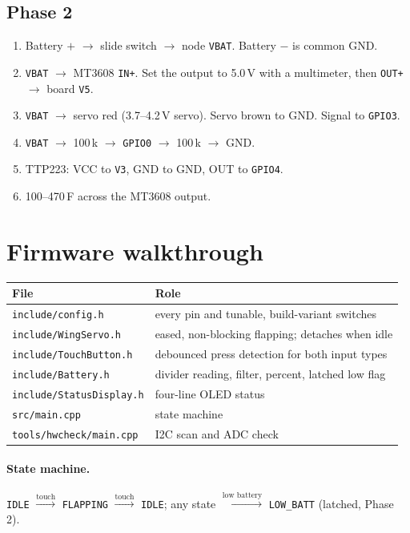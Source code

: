 \documentclass[11pt,a4paper]{article}
\newcommand{\gpio}[1]{\texttt{GPIO#1}}
\begin{document}
\subsection{Phase 2}
\begin{enumerate}
  \item Battery $+$ $\to$ slide switch $\to$ node \texttt{VBAT}. Battery $-$ is common GND.
  \item \texttt{VBAT} $\to$ MT3608 \texttt{IN+}. Set the output to 5.0\,V with a multimeter, then \texttt{OUT+} $\to$ board \texttt{V5}.
  \item \texttt{VBAT} $\to$ servo red (3.7--4.2\,V servo). Servo brown to GND. Signal to \gpio{3}.
  \item \texttt{VBAT} $\to$ 100\,k $\to$ \gpio{0} $\to$ 100\,k $\to$ GND.
  \item TTP223: VCC to \texttt{V3}, GND to GND, OUT to \gpio{4}.
  \item 100--470\,\textmu F across the MT3608 output.
\end{enumerate}

\section{Firmware walkthrough}
\begin{tabular}{@{}ll@{}}
\toprule
File & Role \\ \midrule
\texttt{include/config.h} & every pin and tunable, build-variant switches \\
\texttt{include/WingServo.h} & eased, non-blocking flapping; detaches when idle \\
\texttt{include/TouchButton.h} & debounced press detection for both input types \\
\texttt{include/Battery.h} & divider reading, filter, percent, latched low flag \\
\texttt{include/StatusDisplay.h} & four-line OLED status \\
\texttt{src/main.cpp} & state machine \\
\texttt{tools/hwcheck/main.cpp} & I2C scan and ADC check \\
\bottomrule
\end{tabular}

\paragraph{State machine.}
\texttt{IDLE} $\xrightarrow{\text{touch}}$ \texttt{FLAPPING} $\xrightarrow{\text{touch}}$ \texttt{IDLE};
any state $\xrightarrow{\text{low battery}}$ \texttt{LOW\_BATT} (latched, Phase 2).
\end{document}
